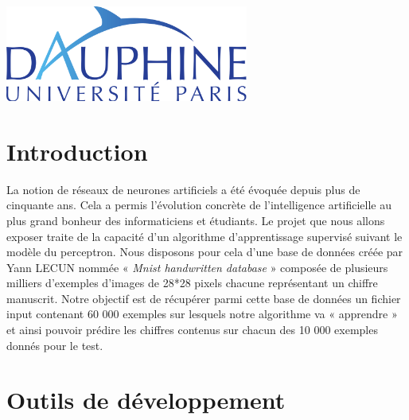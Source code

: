 \documentclass[11pt]{article}
\begin{document}
\begin{titlepage}
	\leavevmode \newline 	\leavevmode \newline 	\leavevmode \newline 	\leavevmode \newline 	\leavevmode \newline 
	\includegraphics[width=0.6\textwidth]{dauphine.png}\\[1cm] 
	 

	

	
\end{titlepage}

\renewcommand{\thesection}{\Roman{section}}
\renewcommand{\thesubsection}{\thesection.\Roman{subsection}}





\section{Introduction}


La notion de réseaux de neurones artificiels a été évoquée depuis plus de cinquante ans. Cela a permis l’évolution concrète de l’intelligence artificielle au plus grand bonheur des informaticiens et étudiants. Le projet que nous allons exposer traite de la capacité d’un algorithme d’apprentissage supervisé suivant le modèle du perceptron. \newline  \newline
Nous disposons pour cela d’une base de données créée par Yann \textsc{LECUN} nommée « \textit {Mnist handwritten database} » composée de plusieurs milliers d’exemples d’images de 28*28 pixels chacune représentant un chiffre manuscrit. \newline
Notre objectif est de récupérer parmi cette base de données un fichier input contenant 60 000 exemples sur lesquels notre algorithme va « apprendre » et ainsi pouvoir prédire les chiffres contenus sur chacun des 10 000 exemples donnés pour le test.\newline 



\section{Outils de développement}
\end{document}
